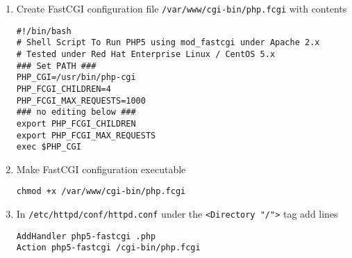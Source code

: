 \documentclass[twoside]{book}
\begin{document}
\begin{enumerate}
\begin{enumerate}
\item Create FastCGI configuration file \texttt{/var/www/cgi-bin/php.fcgi} with contents
\begin{verbatim}
#!/bin/bash
# Shell Script To Run PHP5 using mod_fastcgi under Apache 2.x
# Tested under Red Hat Enterprise Linux / CentOS 5.x
### Set PATH ###
PHP_CGI=/usr/bin/php-cgi
PHP_FCGI_CHILDREN=4
PHP_FCGI_MAX_REQUESTS=1000
### no editing below ###
export PHP_FCGI_CHILDREN
export PHP_FCGI_MAX_REQUESTS
exec $PHP_CGI
\end{verbatim}

\item Make FastCGI configuration executable
\begin{verbatim}
chmod +x /var/www/cgi-bin/php.fcgi
\end{verbatim}

\item In \texttt{/etc/httpd/conf/httpd.conf} under the \texttt{<Directory "/">} tag add lines
\begin{verbatim}
AddHandler php5-fastcgi .php
Action php5-fastcgi /cgi-bin/php.fcgi
\end{verbatim}
\end{enumerate}
\end{enumerate}
			
\end{document}
